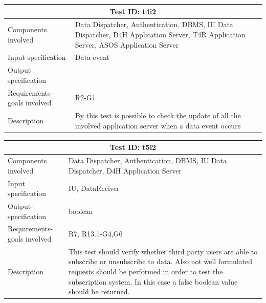 \begin{table}[H]
\centering
\begin{tabular}{ |p{4.5cm}||p{11cm}|  }
 \hline
 \multicolumn{2}{|c|}{Test ID: t4i2} \\
 
 \hline 
 Components involved  	&  Data Dispatcher, Authentication, DBMS, IU Data Dispatcher, D4H Application Server, T4R Application Server, ASOS Application Server  \\
 Input specification  	&  	 Data event\\
Output specification  	& 	 \\
Requirements-goals involved &    R2-G1\\
Description  	& By this test is possible to check the update of all the involved application server when a data event occurs\\
 \hline
\end{tabular}
\end{table}

\begin{table}[H]
\centering
\begin{tabular}{ |p{4.5cm}||p{11cm}|  }
 \hline
 \multicolumn{2}{|c|}{Test ID: t5i2} \\
 
 \hline 
 Components involved  	&  Data Dispatcher, Authentication, DBMS, IU Data Dispatcher, D4H Application Server\\
 Input specification  	&  	IU, DataReciver \\
Output specification  	& 	  	boolean\\
Requirements-goals involved &     R7, R13.1-G4,G6\\
Description  	& This test should verify whether third party users are able to subscribe or unsubscribe to data. Also not well formulated requests should be performed in order to test the subscription system. In this case a false boolean value should be returned.\\
 \hline
\end{tabular}
\end{table}


